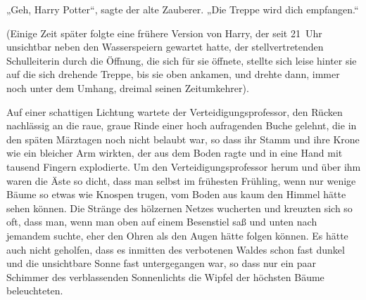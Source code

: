 „Geh, Harry Potter“, sagte der alte Zauberer.
„Die Treppe wird dich empfangen.“

(Einige Zeit später folgte eine frühere Version von Harry, der seit 21~Uhr unsichtbar neben den Wasserspeiern gewartet hatte, der stellvertretenden Schulleiterin durch die Öffnung, die sich für sie öffnete, stellte sich leise hinter sie auf die sich drehende Treppe, bis sie oben ankamen, und drehte dann, immer noch unter dem Umhang, dreimal seinen Zeitumkehrer).


Auf einer schattigen Lichtung wartete der Verteidigungsprofessor, den Rücken nachlässig an die raue, graue Rinde einer hoch aufragenden Buche gelehnt, die in den späten Märztagen noch nicht belaubt war, so dass ihr Stamm und ihre Krone wie ein bleicher Arm wirkten, der aus dem Boden ragte und in eine Hand mit tausend Fingern explodierte. Um den Verteidigungsprofessor herum und über ihm waren die Äste so dicht, dass man selbst im frühesten Frühling, wenn nur wenige Bäume so etwas wie Knospen trugen, vom Boden aus kaum den Himmel hätte sehen können. Die Stränge des hölzernen Netzes wucherten und kreuzten sich so oft, dass man, wenn man oben auf einem Besenstiel saß und unten nach jemandem suchte, eher den Ohren als den Augen hätte folgen können. Es hätte auch nicht geholfen, dass es inmitten des verbotenen Waldes schon fast dunkel und die unsichtbare Sonne fast untergegangen war, so dass nur ein paar Schimmer des verblassenden Sonnenlichts die Wipfel der höchsten Bäume beleuchteten.

